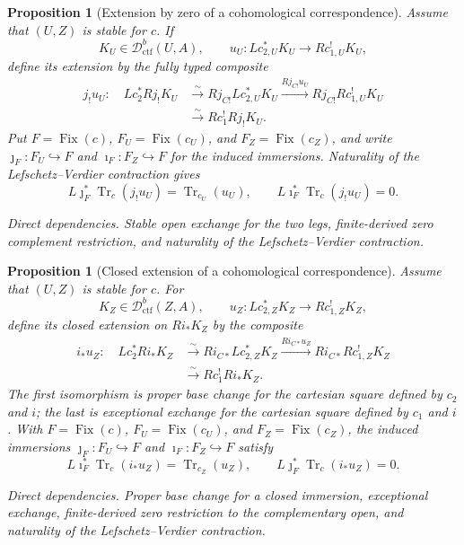 \documentclass[10pt]{article}
\newtheorem{proposition}[theorem]{Proposition}
\theoremstyle{definition}
\newcommand{\Dctf}{\mathcal D^b_{\mathrm{ctf}}}
\newcommand{\Fix}{\operatorname{Fix}}
\newcommand{\depends}[1]{\par\smallskip\noindent\textit{Direct dependencies.} #1\par}
\begin{document}
\begin{proposition}[Extension by zero of a cohomological correspondence]
Assume that \((U,Z)\) is stable for \(c\).  If
\[
 K_U\in\Dctf(U,A),\qquad
 u_U:Lc_{2,U}^*K_U\longrightarrow Rc_{1,U}^!K_U,
\]
define its extension by the fully typed composite
\[
\begin{aligned}
 j_!u_U:\quad Lc_2^*Rj_!K_U
 &\xrightarrow{\sim}Rj_{C!}Lc_{2,U}^*K_U
 \xrightarrow{Rj_{C!}u_U}Rj_{C!}Rc_{1,U}^!K_U\\
 &\xrightarrow{\sim}Rc_1^!Rj_!K_U.
\end{aligned}
\]
Put \(F=\Fix(c)\), \(F_U=\Fix(c_U)\), and \(F_Z=\Fix(c_Z)\), and write
\(\jmath_F:F_U\hookrightarrow F\) and \(\imath_F:F_Z\hookrightarrow F\)
for the induced immersions.  Naturality of the Lefschetz--Verdier contraction gives
\[
 L\jmath_F^*\operatorname{Tr}_c(j_!u_U)
   =\operatorname{Tr}_{c_U}(u_U),
 \qquad
 L\imath_F^*\operatorname{Tr}_c(j_!u_U)=0.
\]
\depends{Stable open exchange for the two legs, finite-derived zero
complement restriction, and naturality of the Lefschetz--Verdier contraction.}
\end{proposition}

\begin{proposition}[Closed extension of a cohomological correspondence]
Assume that \((U,Z)\) is stable for \(c\).  For
\[
 K_Z\in\Dctf(Z,A),\qquad
 u_Z:Lc_{2,Z}^*K_Z\longrightarrow Rc_{1,Z}^!K_Z,
\]
define its closed extension on \(Ri_*K_Z\) by the composite
\[
\begin{aligned}
 i_*u_Z:\quad Lc_2^*Ri_*K_Z
 &\xrightarrow{\sim}Ri_{C*}Lc_{2,Z}^*K_Z
 \xrightarrow{Ri_{C*}u_Z}Ri_{C*}Rc_{1,Z}^!K_Z\\
 &\xrightarrow{\sim}Rc_1^!Ri_*K_Z.
\end{aligned}
\]
The first isomorphism is proper base change for the cartesian square defined
by \(c_2\) and \(i\); the last is exceptional exchange for the cartesian
square defined by \(c_1\) and \(i\).  With
\(F=\Fix(c)\), \(F_U=\Fix(c_U)\), and \(F_Z=\Fix(c_Z)\), the induced
immersions \(\jmath_F:F_U\hookrightarrow F\) and
\(\imath_F:F_Z\hookrightarrow F\) satisfy
\[
 L\imath_F^*\operatorname{Tr}_c(i_*u_Z)
   =\operatorname{Tr}_{c_Z}(u_Z),
 \qquad
 L\jmath_F^*\operatorname{Tr}_c(i_*u_Z)=0.
\]
\depends{Proper base change for a closed immersion, exceptional exchange,
finite-derived zero restriction to the complementary open, and naturality
of the Lefschetz--Verdier contraction.}
\end{proposition}
\end{document}
